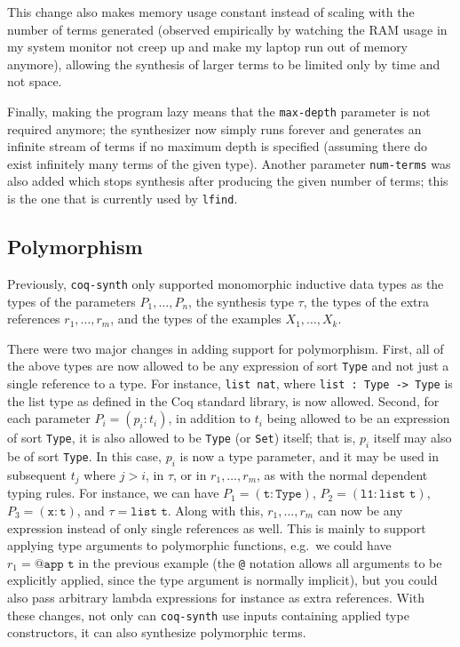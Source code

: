 \documentclass[11pt]{article}
\newcommand{\coq}[1]{\texttt{#1}}
\begin{document}
This change also makes memory usage constant instead of scaling with the number of terms generated (observed empirically by watching the RAM usage in my system monitor not creep up and make my laptop run out of memory anymore), allowing the synthesis of larger terms to be limited only by time and not space.

Finally, making the program lazy means that the \texttt{max-depth} parameter is not required anymore; the synthesizer now simply runs forever and generates an infinite stream of terms if no maximum depth is specified (assuming there do exist infinitely many terms of the given type). Another parameter \texttt{num-terms} was also added which stops synthesis after producing the given number of terms; this is the one that is currently used by \texttt{lfind}.

\subsection{Polymorphism}

Previously, \texttt{coq-synth} only supported monomorphic inductive data types as the types of the parameters $P_1, \dots, P_n$, the synthesis type $\tau$, the types of the extra references $r_1, \dots, r_m$, and the types of the examples $X_1, \dots, X_k$.

There were two major changes in adding support for polymorphism. First, all of the above types are now allowed to be any expression of sort \coq{Type} and not just a single reference to a type. For instance, \coq{list nat}, where \coq{list : Type -> Type} is the list type as defined in the Coq standard library, is now allowed. Second, for each parameter $P_i = (p_i : t_i)$, in addition to $t_i$ being allowed to be an expression of sort \coq{Type}, it is also allowed to be \coq{Type} (or \coq{Set}) itself; that is, $p_i$ itself may also be of sort \coq{Type}. In this case, $p_i$ is now a type parameter, and it may be used in subsequent $t_j$ where $j > i$, in $\tau$, or in $r_1, \dots, r_m$, as with the normal dependent typing rules. For instance, we can have $P_1 = (\coq{t} : \coq{Type})$, $P_2 = (\coq{l1} : \coq{list t})$, $P_3 = (\coq{x} : \coq{t})$, and $\tau = \coq{list t}$. Along with this, $r_1, \dots, r_m$ can now be any expression instead of only single references as well. This is mainly to support applying type arguments to polymorphic functions, e.g.\ we could have $r_1 = \coq{@app t}$ in the previous example (the \coq{@} notation allows all arguments to be explicitly applied, since the type argument is normally implicit), but you could also pass arbitrary lambda expressions for instance as extra references. With these changes, not only can \texttt{coq-synth} use inputs containing applied type constructors, it can also synthesize polymorphic terms.
\end{document}

